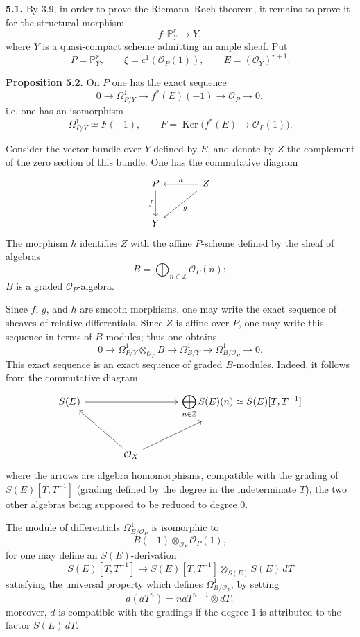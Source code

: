 \documentclass[11pt]{article}
\providecommand{\Ker}{\operatorname{Ker}}
\begin{document}
\textbf{5.1.} By 3.9, in order to prove the Riemann--Roch theorem, it remains to prove it for the structural morphism
\[
f:\mathbb P^r_Y\longrightarrow Y,
\]
where \(Y\) is a quasi-compact scheme admitting an ample sheaf. Put
\[
P=\mathbb P^r_Y,\qquad \xi=c^1(\mathcal O_P(1)),\qquad E=(\mathcal O_Y)^{r+1}.
\]

\textbf{Proposition 5.2.} On \(P\) one has the exact sequence
\[
0\longrightarrow\Omega^1_{P/Y}\longrightarrow f^*(E)(-1)\longrightarrow\mathcal O_P\longrightarrow0,
\]
i.e. one has an isomorphism
\[
\Omega^1_{P/Y}\simeq F(-1),
\qquad
F=\Ker\bigl(f^*(E)\longrightarrow\mathcal O_P(1)\bigr).
\]

Consider the vector bundle over \(Y\) defined by \(E\), and denote by \(Z\) the complement of the zero section of this bundle. One has the commutative diagram
\[
\begin{tikzcd}[column sep=large,row sep=large]
P \arrow[d,"f"'] & Z \arrow[l,"h"'] \arrow[dl,"g"]\\
Y &
\end{tikzcd}
\]
The morphism \(h\) identifies \(Z\) with the affine \(P\)-scheme defined by the sheaf of algebras
\[
B=\bigoplus_{n\in\mathbb Z}\mathcal O_P(n);
\]
\(B\) is a graded \(\mathcal O_P\)-algebra.

Since \(f\), \(g\), and \(h\) are smooth morphisms, one may write the exact sequence of sheaves of relative differentials. Since \(Z\) is affine over \(P\), one may write this sequence in terms of \(B\)-modules; thus one obtains
\begin{equation}\tag{5.2.1}
0\longrightarrow
 \Omega^1_{P/Y}\otimes_{\mathcal O_P}B
\longrightarrow
 \Omega^1_{B/Y}
\longrightarrow
 \Omega^1_{B/\mathcal O_P}
\longrightarrow0 .
\end{equation}
This exact sequence is an exact sequence of graded \(B\)-modules. Indeed, it follows from the commutative diagram
\[
\begin{tikzcd}[column sep=large,row sep=large]
S(E) \arrow[rr] && \displaystyle\bigoplus_{n\in\mathbb Z}S(E)(n)\simeq S(E)[T,T^{-1}]\\
& \mathcal O_X \arrow[ul] \arrow[ur] &
\end{tikzcd}
\]
where the arrows are algebra homomorphisms, compatible with the grading of \(S(E)[T,T^{-1}]\) (grading defined by the degree in the indeterminate \(T\)), the two other algebras being supposed to be reduced to degree \(0\).

The module of differentials \(\Omega^1_{B/\mathcal O_P}\) is isomorphic to
\[
 B(-1)\otimes_{\mathcal O_P}\mathcal O_P(1),
\]
for one may define an \(S(E)\)-derivation
\[
S(E)[T,T^{-1}]
\longrightarrow
S(E)[T,T^{-1}]\otimes_{S(E)}S(E)\,dT
\]
satisfying the universal property which defines \(\Omega^1_{B/\mathcal O_P}\), by setting
\[
 d(aT^n)=naT^{n-1}\otimes dT;
\]
moreover, \(d\) is compatible with the gradings if the degree \(1\) is attributed to the factor \(S(E)\,dT\).
\end{document}
